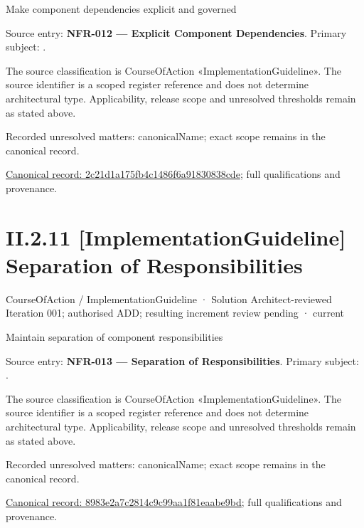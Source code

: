 Make component dependencies explicit and governed



Source entry: \textbf{NFR-012 — Explicit Component Dependencies}. Primary subject: \texttt{}.



The source classification is CourseOfAction «ImplementationGuideline». The source identifier is a scoped register reference and does not determine architectural type. Applicability, release scope and unresolved thresholds remain as stated above.


{\small Recorded unresolved matters: canonicalName; exact scope remains in the canonical record.}\par
{\footnotesize \href{../../../../continuum/strategy/course-of-action/implementation-guideline/2c21d1a175fb4c1486f6a91830838cde.md}{Canonical record: 2c21d1a175fb4c1486f6a91830838cde}; full qualifications and provenance.}\par
\section*{II.2.11 [ImplementationGuideline] Separation of Responsibilities}
\label{navigation:II.2.11}

\label{element:8983e2a7c2814c9c99aa1f81eaabe9bd}
{\small CourseOfAction / ImplementationGuideline · Solution Architect-reviewed Iteration 001; authorised ADD; resulting increment review pending · current}\par

Maintain separation of component responsibilities



Source entry: \textbf{NFR-013 — Separation of Responsibilities}. Primary subject: \texttt{}.



The source classification is CourseOfAction «ImplementationGuideline». The source identifier is a scoped register reference and does not determine architectural type. Applicability, release scope and unresolved thresholds remain as stated above.


{\small Recorded unresolved matters: canonicalName; exact scope remains in the canonical record.}\par
{\footnotesize \href{../../../../continuum/strategy/course-of-action/implementation-guideline/8983e2a7c2814c9c99aa1f81eaabe9bd.md}{Canonical record: 8983e2a7c2814c9c99aa1f81eaabe9bd}; full qualifications and provenance.}\par
